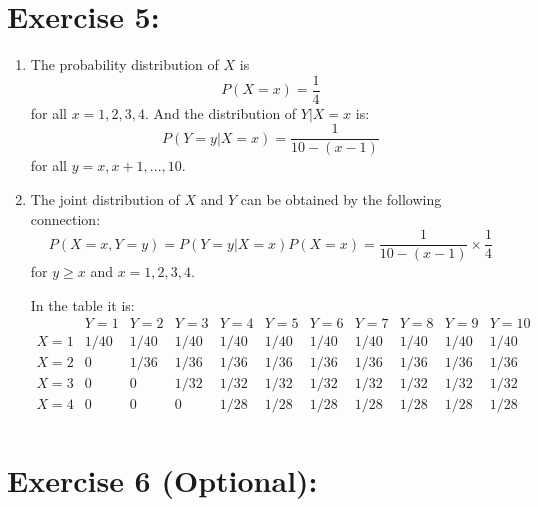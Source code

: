 \documentclass[12pt,thmsa]{article}\usepackage[]{graphicx}\usepackage[]{color}
\begin{document}
\section*{Exercise 5:}

\begin{enumerate}
  \item The probability distribution of $X$ is
  \begin{equation*}
    P(X=x)=\frac{1}{4}  %
  \end{equation*}
for all $x=1,2,3,4$. And the distribution of $Y\vert X=x$ is:
  \begin{equation}
  P(Y=y\vert X=x)=\frac{1}{10-(x-1)} %
  \end{equation}
for all $y=x, x+1,...,10$.

  \item The joint distribution of $X$ and $Y$ can be obtained by the following connection:
\begin{equation*}
P(X=x,Y=y)=P(Y=y\vert X=x) P(X=x)=\frac{1}{10-(x-1)} \times \frac{1}{4}  %
\end{equation*}
for $y \geq x$ and $x=1,2,3,4$.

In the table it is:
$$
\begin{array}{c|c|c|c|c|c|c|c|c|c|c}
   & Y=1 & Y=2 & Y=3 & Y=4 & Y=5 & Y=6 & Y=7 & Y=8 & Y=9 & Y=10 \\ \hline
  X=1 & 1/40 & 1/40 & 1/40 & 1/40 & 1/40 & 1/40 & 1/40 & 1/40 & 1/40 & 1/40 \\ \hline
  X=2 & 0 & 1/36 & 1/36 & 1/36 & 1/36 & 1/36 & 1/36 & 1/36 & 1/36 & 1/36 \\ \hline
  X=3 & 0 & 0 & 1/32 & 1/32 & 1/32 & 1/32 & 1/32 & 1/32 & 1/32 & 1/32 \\ \hline
  X=4 & 0 & 0 & 0 & 1/28 & 1/28 & 1/28 & 1/28 & 1/28 & 1/28 & 1/28 \\
\end{array}
$$



\end{enumerate}


\section*{Exercise 6 (Optional):}
\end{document}
